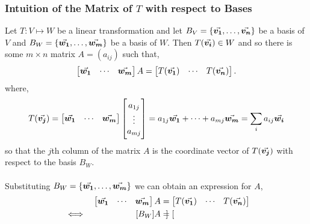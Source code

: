 \documentclass[MathsNotesBase.tex]{subfiles}
\begin{document}
{		\medskip\label{def:matrix_of_lin_transform_wrt_bases}
	
		\medskip
		\subsubsection{Intuition of the Matrix of $T$ with respect to Bases}
		\medskip
		Let ${ T: V \longmapsto W }$ be a linear transformation and let ${ B_V = \{\vec{\bm{v_1}},\dots,\vec{\bm{v_n}}\} }$ be a basis of $V$ and ${ B_W = \{\vec{\bm{w_1}},\dots,\vec{\bm{w_m}}\} }$ be a basis of $W$. Then ${ T(\vec{\bm{v_i}}) \in W }$ and so there is some ${ m \times n }$ matrix ${ A = (a_{ij}) }$ such that,
		\[
			\begin{bmatrix}
			\vec{\bm{w_1}} & \cdots & \vec{\bm{w_m}}
			\end{bmatrix}
			A
			=
			\begin{bmatrix}
			T(\vec{\bm{v_1}}) & \cdots & T(\vec{\bm{v_n}})
			\end{bmatrix}.		
		\]
			where,
		\[ T(\vec{\bm{v_j}}) = 
			\begin{bmatrix}
				\vec{\bm{w_1}} & \cdots & \vec{\bm{w_m}}
			\end{bmatrix}
			\begin{bmatrix}
				a_{1j}\\
				\vdots \\
				a_{mj}
			\end{bmatrix}
					= a_{1j}\vec{\bm{w_1}} + \cdots + a_{mj}\vec{\bm{w_m}} = \sum_i a_{ij}\vec{\bm{w_i}} 
		\]
		so that the $j$th column of the matrix $A$ is the coordinate vector of $T(\vec{\bm{v_j}})$ with respect to the basis $B_W$.\\\\		
		Substituting ${ B_W = \{\vec{\bm{w_1}},\dots,\vec{\bm{w_m}}\} }$ we can obtain an expression for $A$,
		\begin{align*}
		&& \begin{bmatrix}
			\vec{\bm{w_1}} & \cdots & \vec{\bm{w_m}}
			\end{bmatrix}
			A &=
			\begin{bmatrix}
			T(\vec{\bm{v_1}}) & \cdots & T(\vec{\bm{v_n}})
			\end{bmatrix} \\
		&\iff & [B_W]A &= \begin{bmatrix}

\end{bmatrix}
\end{align*}}
\end{document}
